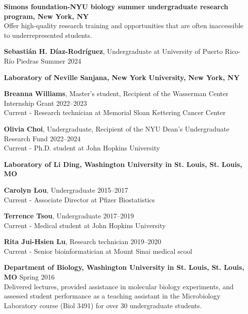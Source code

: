 \documentclass[letterpaper,11pt]{cv}
\begin{document}
\begin{entrylist}
\raggedright
\item \textbf{Simons foundation-NYU biology summer undergraduate research program, New York, NY}\\  
{\small Offer high-quality research training and opportunities that are often inaccessible to underrepresented students.}
\begin{detaillist}
    \item \textbf{Sebastián H. Díaz-Rodríguez}, Undergraduate at University of Puerto Rico-Río Piedras \hfill Summer 2024 \\
\end{detaillist}
\item \textbf{Laboratory of Neville Sanjana, New York University, New York, NY}\\
    \begin{detaillist}
       \item \textbf{Breanna Williams}, Master's student, Recipient of the Wasserman Center Internship Grant \hfill 2022--2023\\
       Current - Research technician at Memorial Sloan Kettering Cancer Center
       \item \textbf{Olivia Choi}, Undergraduate, Recipient of the NYU Dean's Undergraduate Research Fund \hfill 2022--2024\\
       Current - Ph.D. student at John Hopkins University
    \end{detaillist}
\item \textbf{Laboratory of Li Ding, Washington University in St. Louis, St. Louis, MO}\\
    \begin{detaillist}
    \item \textbf{Carolyn Lou}, Undergraduate  \hfill 2015--2017\\
    Current - Associate Director at Pfizer Biostatistics
    \item \textbf{Terrence Tsou}, Undergraduate  \hfill 2017--2019\\
    Current - Medical student at John Hopkins University
    \item \textbf{Rita Jui-Hsien Lu}, Research technician \hfill 2019--2020\\
    Current - Senior bioinformatician at Mount Sinai medical scool
    \end{detaillist}
\item \textbf{Department of Biology, Washington University in St. Louis, St. Louis, MO} \hfill Spring 2016 \\
    {\small Delivered lectures, provided assistance in molecular biology experiments, and assessed student performance as a teaching assistant in the Microbiology Laboratory course (Biol 3491) for over 30 undergraduate students.}
\end{entrylist}
\end{document}
